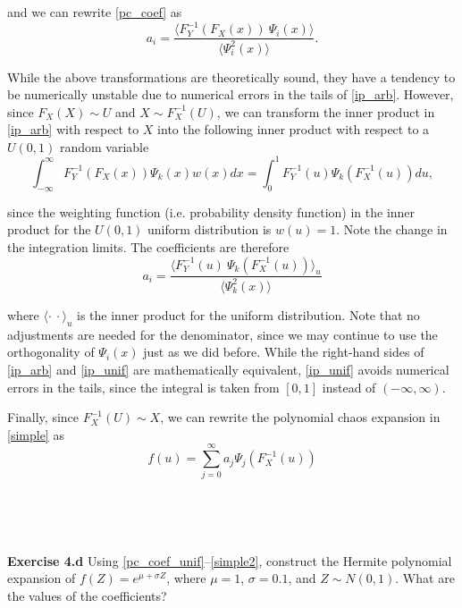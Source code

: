\documentclass[11pt]{article}
\numberwithin{equation}{section}
\begin{document}
and we can rewrite \eqref{pc_coef} as
\begin{equation}
a_i = \frac{\langle F_Y^{-1} (F_X(x)) \ \Psi_i(x) \rangle}{\langle \Psi_i^2(x) \rangle}. \label{pc_coef_arb}
\end{equation}

\qquad While the above transformations are theoretically sound, they have a tendency to be numerically unstable due to numerical errors in the tails of \eqref{ip_arb}. However, since $F_X(X) \sim U$ and $X \sim F_X^{-1}(U)$, we can transform the inner product in \eqref{ip_arb} with respect to $X$ into the following inner product with respect to a $U(0, 1)$ random variable
\begin{equation}
\int_{-\infty}^{\infty} F_Y^{-1} (F_X(x)) \Psi_k(x) w(x) dx = \int_{0}^{1} F_Y^{-1} (u) \Psi_k(F_X^{-1}(u)) du, \label{ip_unif}
\end{equation}

since the weighting function (i.e. probability density function) in the inner product for the $U(0,1)$ uniform distribution is $w(u) = 1$. Note the change in the integration limits. The coefficients are therefore
\begin{equation}
a_i = \frac{\langle F_Y^{-1}(u) \ \Psi_k(F_X^{-1}(u)) \rangle_u}{\langle \Psi_k^2(x) \rangle} \label{pc_coef_unif}
\end{equation}

where $\langle \cdot \ \cdot \rangle_u$ is the inner product for the uniform distribution. Note that no adjustments are needed for the denominator, since we may continue to use the orthogonality of $\Psi_i(x)$ just as we did before. While the right-hand sides of \eqref{ip_arb} and \eqref{ip_unif} are mathematically equivalent, \eqref{ip_unif} avoids numerical errors in the tails, since the integral is taken from $[0, 1]$ instead of $(-\infty, \infty)$.

\qquad Finally, since $F_X^{-1}(U) \sim X$, we can rewrite the polynomial chaos expansion in \eqref{simple} as
\begin{equation}
f(u) = \sum_{j=0}^{\infty}  a_j \Psi_j(F_X^{-1}(u)) \label{simple2}
\end{equation}





\

\

\textbf{Exercise 4.d} Using \eqref{pc_coef_unif}--\eqref{simple2}, construct the Hermite polynomial expansion of $f(Z) = e^{\mu + \sigma Z}$, where $\mu = 1$, $\sigma = 0.1$, and $Z \sim N(0,1)$. What are the values of the coefficients?
\end{document}
